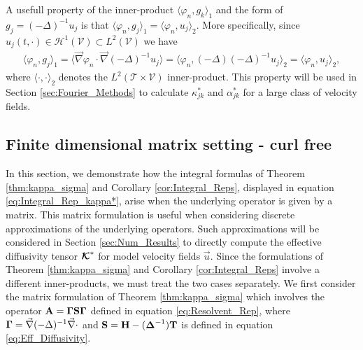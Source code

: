\documentclass[11pt]{amsart}
\newcommand{\Tb}{\mathbf{T}}
\newcommand{\Hb}{\mathbf{H}}
\newcommand{\Sb}{\mathbf{S}}
\newcommand{\Ab}{\mathbf{A}}
\newcommand\Kbc{\mbox{\boldmath${\mathcal{K}}$}}
\newcommand{\Tc}{\mathcal{T}}
\newcommand{\Vc}{\mathcal{V}}
\newcommand{\Hc}{\mathcal{H}}
\newcommand\bDelta{\mbox{\boldmath${\Delta}$}}
\newcommand\bGamma{\mbox{\boldmath${\Gamma}$}}
\begin{document}
A usefull property of the inner-product $\langle\varphi_n,g_k\rangle_1$ and the form of
$g_j=(-\Delta)^{-1}u_j$ is that $\langle\varphi_n,g_j\rangle_1=\langle\varphi_n,u_j\rangle_2$. More
specifically, since $u_j(t,\cdot)\in\Hc^1(\Vc)\subset L^2(\Vc)$ we have
\cite{Stakgold:BVP:2000}  
%
\begin{align}\label{eq:H1_to_L2}
  \langle\varphi_n,g_j\rangle_1=\langle\vec{\nabla}\varphi_n\cdot\vec{\nabla}(-\Delta)^{-1}u_j\rangle
         =\langle\varphi_n,(-\Delta)(-\Delta)^{-1}u_j\rangle_2
         =\langle\varphi_n,u_j\rangle_2,
\end{align}
%
where $\langle\cdot,\cdot\rangle_2$ denotes the $L^2(\Tc\times\Vc)$ inner-product. This
property will be used in Section \ref{sec:Fourier_Methods} to
calculate $\kappa^*_{jk}$ and $\alpha^*_{jk}$ for a large class of velocity
fields.   



%
\subsection{Finite dimensional matrix setting - curl free}
\label{sec:Integral_Rep_Matrix_curl_free}  
%
In this section, we demonstrate how the integral formulas of Theorem
\ref{thm:kappa_sigma} and Corollary \ref{cor:Integral_Reps}, displayed 
in equation \eqref{eq:Integral_Rep_kappa*}, arise when the underlying
operator is given by a matrix. This matrix formulation is useful when
considering discrete approximations of the underlying operators. Such
approximations will be considered in Section \ref{sec:Num_Results} to
directly compute the effective diffusivity tensor $\Kbc^*$ for model
velocity fields $\vec{u}$. Since the formulations of Theorem
\ref{thm:kappa_sigma} and Corollary \ref{cor:Integral_Reps} involve a
different inner-products, we must treat the two cases separately. We
first consider the matrix formulation of Theorem \ref{thm:kappa_sigma}
which involves the operator $\Ab=\bGamma\Sb\bGamma$ defined in
equation \eqref{eq:Resolvent_Rep}, where
$\bGamma=\vec{\nabla}(-\Delta)^{-1}\vec{\nabla}\cdot$ and $\Sb=\Hb-(\bDelta^{-1})\Tb$ is
defined in equation \eqref{eq:Eff_Diffusivity}.  
\end{document}
